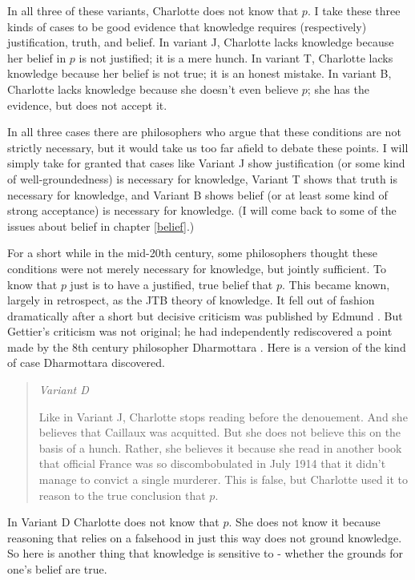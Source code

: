 \documentclass[11pt,]{book}
\begin{document}
In all three of these variants, Charlotte does not know that \(p\). I take these three kinds of cases to be good evidence that knowledge requires (respectively) justification, truth, and belief. In variant J, Charlotte lacks knowledge because her belief in \(p\) is not justified; it is a mere hunch. In variant T, Charlotte lacks knowledge because her belief is not true; it is an honest mistake. In variant B, Charlotte lacks knowledge because she doesn't even believe \(p\); she has the evidence, but does not accept it.

In all three cases there are philosophers who argue that these conditions are not strictly necessary, but it would take us too far afield to debate these points. I will simply take for granted that cases like Variant J show justification (or some kind of well-groundedness) is necessary for knowledge, Variant T shows that truth is necessary for knowledge, and Variant B shows belief (or at least some kind of strong acceptance) is necessary for knowledge. (I will come back to some of the issues about belief in chapter \ref{belief}.)

For a short while in the mid-20th century, some philosophers thought these conditions were not merely necessary for knowledge, but jointly sufficient. To know that \(p\) just is to have a justified, true belief that \(p\). This became known, largely in retrospect, as the JTB theory of knowledge. It fell out of fashion dramatically after a short but decisive criticism was published by Edmund \citet{Gettier1963}. But Gettier's criticism was not original; he had independently rediscovered a point made by the 8th century philosopher Dharmottara \citep{Nagel2014}. Here is a version of the kind of case Dharmottara discovered.

\begin{quote}
\emph{Variant D}

Like in Variant J, Charlotte stops reading before the denouement. And she believes that Caillaux was acquitted. But she does not believe this on the basis of a hunch. Rather, she believes it because she read in another book that official France was so discombobulated in July 1914 that it didn't manage to convict a single murderer. This is false, but Charlotte used it to reason to the true conclusion that \(p\).
\end{quote}

In Variant D Charlotte does not know that \(p\). She does not know it because reasoning that relies on a falsehood in just this way does not ground knowledge. So here is another thing that knowledge is sensitive to - whether the grounds for one's belief are true.
\end{document}
